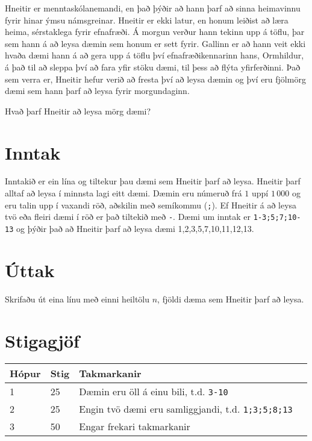 
\noindent
Hneitir er menntaskólanemandi,
en það þýðir að hann þarf að sinna heimavinnu fyrir hinar ýmsu námsgreinar.
Hneitir er ekki latur, en honum leiðist að læra heima, sérstaklega fyrir efnafræði. 
Á morgun verður hann tekinn upp á töflu,
þar sem hann á að leysa dæmin sem honum er sett fyrir.
Gallinn er að hann veit ekki hvaða dæmi hann á að gera upp á töflu 
því efnafræðikennarinn hans, Ormhildur,
á það til að sleppa því að fara yfir stöku dæmi, til þess að flýta yfirferðinni. 
Það sem verra er, Hneitir hefur verið að fresta því að leysa dæmin
og því eru fjölmörg dæmi sem hann þarf að leysa fyrir morgundaginn.

Hvað þarf Hneitir að leysa mörg dæmi?

\section*{Inntak}
Inntakið er ein lína og tiltekur þau dæmi sem Hneitir þarf að leysa.
Hneitir þarf alltaf að leysa í minnsta lagi eitt dæmi.
Dæmin eru númeruð frá $1$ uppí $1\,000$
og eru talin upp í vaxandi röð, aðskilin með semíkommu (\texttt{;}).
Ef Hneitir á að leysa tvö eða fleiri dæmi í röð er það tiltekið með \texttt{-}.
Dæmi um inntak er \texttt{1-3;5;7;10-13}
og þýðir það að Hneitir þarf að leysa dæmi 1,2,3,5,7,10,11,12,13.

\section*{Úttak}
Skrifaðu út eina línu með einni heiltölu $n$,
fjöldi dæma sem Hneitir þarf að leysa.

\section*{Stigagjöf}
\begin{tabular}{|l|l|l|l|}
\hline
Hópur & Stig & Takmarkanir \\ \hline
1     & 25  & Dæmin eru öll á einu bili, t.d. \texttt{3-10} \\ \hline
2     & 25  & Engin tvö dæmi eru samliggjandi, t.d. \texttt{1;3;5;8;13} \\ \hline
3     & 50  & Engar frekari takmarkanir \\ \hline
\end{tabular}
